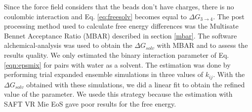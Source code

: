 Since the force field considers that the beads don't have charges, there is no coulombic interaction and Eq. \eqref{eq:freesolv} becomes equal to $\Delta G_{3 \rightarrow 4} $. The post processing method used to calculate free energy differences was the Multisate Bennet Acceptance Ratio (MBAR) described in section \ref{mbar}. The software alchemical-analysis \cite{klimovich} was used to obtain the $\Delta G_{solv}$ with MBAR and to assess the results quality. We only estimated the binary interaction  parameter of Eq. \eqref{eqn:epsmix} for pairs with water as a solvent. The estimation was done by performing trial  expanded ensemble simulations in three values of $k_{ij}$. With the $\Delta G_{solv}$ obtained with these simulations, we did a linear fit to obtain the refined value of the parameter. We usede this strategy because the estimation with SAFT VR Mie EoS gave poor results for the free energy.

